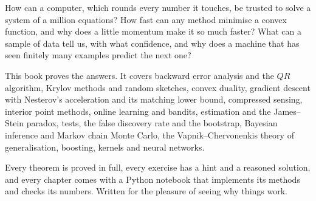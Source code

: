 How can a computer, which rounds every number it touches, be trusted to solve a system of a million equations? How
fast can any method minimise a convex function, and why does a little momentum make it so much faster? What can a
sample of data tell us, with what confidence, and why does a machine that has seen finitely many examples predict the
next one?

This book proves the answers. It covers backward error analysis and the $QR$ algorithm, Krylov methods and random
sketches, convex duality, gradient descent with Nesterov's acceleration and its matching lower bound, compressed
sensing, interior point methods, online learning and bandits, estimation and the James--Stein paradox, tests, the false
discovery rate and the bootstrap, Bayesian inference and Markov chain Monte Carlo, the Vapnik--Chervonenkis theory of
generalisation, boosting, kernels and neural networks.

Every theorem is proved in full, every exercise has a hint and a reasoned solution, and every chapter comes with a
Python notebook that implements its methods and checks its numbers. Written for the pleasure of seeing why things work.
